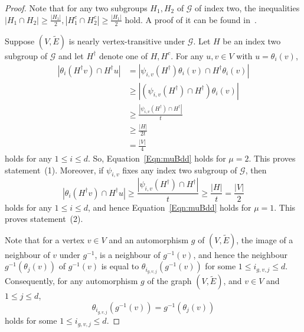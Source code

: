 \documentclass[ALCO,Unicode,published]{cedram}
\newcommand{\mo}{{-1}}
\newcommand{\calG}{\ensuremath{\mathcal{G}}}
\begin{document}
\begin{proof}
Note that for any two subgroups $H_1, H_2$ of $\calG$ of index two, the inequalities 
$|H_1\cap H_2| \geq \frac{|H_1|}{2}, |H_1^c\cap H_2^c| \geq \frac{|H_1|}{2}$
hold. A proof of it can be found in~\cite{CheegerTwisted}.

Suppose $(V, \widetilde E)$ is nearly vertex-transitive under $\calG$. Let $H$ be an index two subgroup of $\calG$ and let $H^\dag$ denote one of $H, H^c$. For any $u,v\in V$ with $u = \theta_i(v)$, 
\begin{align*}
|\theta_i(H^\dag v) \cap H^\dag u|
& = |\psi_{i,v} (H^\dag) \theta_i(v) \cap H^\dag \theta_i(v)|\\
& \geq |(\psi_{i,v} (H^\dag) \cap H^\dag) \theta_i(v)| \\
& \geq \frac{|\psi_{i,v} (H^\dag) \cap H^\dag|}{t} \\
& \geq \frac{|H|}{2t} \\
&= \frac{|V|}{4}
\end{align*}
holds for any $1\leq i \leq d$. So, Equation~\eqref{Eqn:muBdd} holds for $\mu = 2$. This proves statement~(1). Moreover, if $\psi_{i, v}$ fixes any index two subgroup of $\calG$, then 
$$
|\theta_i(H^\dag v) \cap H^\dag u|
\geq
\frac{|\psi_{i,v} (H^\dag) \cap H^\dag|}{t} 
 \geq \frac{|H|}{t}
 = \frac{|V|}{2}
$$
holds for any $1\leq i \leq d$, and hence Equation~\eqref{Eqn:muBdd} holds for $\mu = 1$. This proves statement~(2). 

Note that for a vertex $v \in V$ and an automorphism $g$ of $(V, \widetilde E)$, the image of a neighbour of $v$ under $g^\mo$, is a neighbour of $g^\mo (v)$, and hence the neighbour $g^\mo (\theta_j(v))$ of $g^\mo(v)$ is equal to $\theta_{i_{g, v, j}} (g^\mo(v))$ for some $1\leq i_{g, v, j} \leq d$. Consequently, for any automorphism $g$ of the graph $(V, \widetilde E)$, and $v\in V$ and $1\leq j \leq d$, 
\[\theta_{i_{g, v, j}} (g^\mo (v)) = g^\mo (\theta_j(v))\]
holds for some $1\leq i_{g, v, j} \leq d$.


\end{proof}
\end{document}

